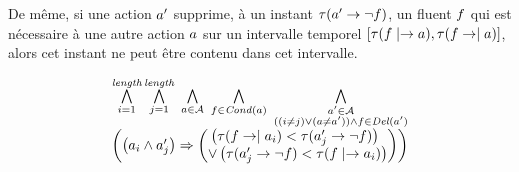 De même, si une action $a'$ supprime, à un instant $\tau(a'\rightarrow\neg f)$, un fluent $f$ qui est nécessaire à une autre action $a$ sur un intervalle temporel $[\tau(f\mid\rightarrow a), \tau(f\rightarrow\mid a)]$, alors cet instant ne peut être contenu dans cet intervalle.

\begin{small}
\[
\begin{matrix}
\BigforallTwo{i=1}{\length}\BigforallTwo{j=1}{\length}%
~\Bigforall{\substack{\a\in \A}}~\Bigforall{\substack{\f\in \cond{\a}}}~\Bigforall{\substack{\b\in \A\\((i \neq j) \vee (\a \neq \b)) \wedge \f \in \del{\b}}}\hfill\\
\left(\left(\a_{i} \wedge \b_{j}\right) \Rightarrow \begin{pmatrix}\left(\tau(\f\rightarrow\mid\a_{i}) < \tau(\b_{j}\rightarrow \neg \f)\right)\hfill\\
 \vee \left(\tau(\b_{j}\rightarrow \neg \f) < \tau(\f\mid\rightarrow\a_{i})\right)\end{pmatrix}\right)%
\end{matrix}
\]
\end{small}



